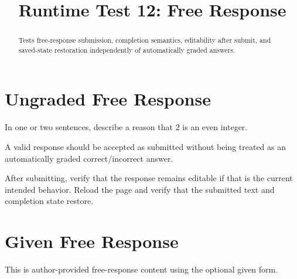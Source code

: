 \documentclass{ximera}
\title{Runtime Test 12: Free Response}
\begin{document}
\begin{abstract}
Tests free-response submission, completion semantics, editability after submit,
and saved-state restoration independently of automatically graded answers.
\end{abstract}
\maketitle

\section{Ungraded Free Response}

\begin{problem}
In one or two sentences, describe a reason that \(2\) is an even integer.

\begin{freeResponse}
A valid response should be accepted as submitted without being treated as an
automatically graded correct/incorrect answer.
\end{freeResponse}
\end{problem}

After submitting, verify that the response remains editable if that is the
current intended behavior. Reload the page and verify that the submitted text
and completion state restore.

\section{Given Free Response}

\begin{freeResponse}[true]
This is author-provided free-response content using the optional given form.
\end{freeResponse}
\end{document}
